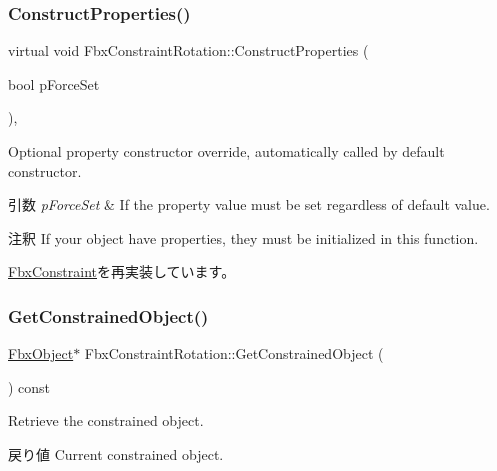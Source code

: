 \subsubsection{\texorpdfstring{Construct\+Properties()}{ConstructProperties()}}
{\footnotesize\ttfamily virtual void Fbx\+Constraint\+Rotation\+::\+Construct\+Properties (\begin{DoxyParamCaption}\item[{bool}]{p\+Force\+Set }\end{DoxyParamCaption})\hspace{0.3cm}{\ttfamily [protected]}, {\ttfamily [virtual]}}

Optional property constructor override, automatically called by default constructor. 
\begin{DoxyParams}{引数}
{\em p\+Force\+Set} & If the property value must be set regardless of default value. \\
\hline
\end{DoxyParams}
\begin{DoxyRemark}{注釈}
If your object have properties, they must be initialized in this function. 
\end{DoxyRemark}


\hyperlink{class_fbx_constraint_a0470a25b813b337d07a03ce4b97b44f8}{Fbx\+Constraint}を再実装しています。

\mbox{\label{class_fbx_constraint_rotation_ad9bdaf083716c730fdd907a9387e4991}} 
\subsubsection{\texorpdfstring{Get\+Constrained\+Object()}{GetConstrainedObject()}}
{\footnotesize\ttfamily \hyperlink{class_fbx_object}{Fbx\+Object}$\ast$ Fbx\+Constraint\+Rotation\+::\+Get\+Constrained\+Object (\begin{DoxyParamCaption}{ }\end{DoxyParamCaption}) const\hspace{0.3cm}{\ttfamily [virtual]}}

Retrieve the constrained object. \begin{DoxyReturn}{戻り値}
Current constrained object. 
\end{DoxyReturn}


